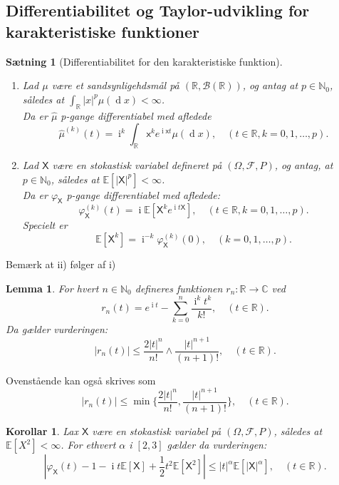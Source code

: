 \documentclass{article}
\newcommand{\N}{\mathbb{N}}
\newcommand{\R}{\mathbb{R}}
\newcommand{\C}{\mathbb{C}}
\newcommand{\E}{\mathbb{E}}
\newcommand{\1}{\mathbbm{1}}
\newcommand{\X}{\mathsf{X}}
\newcommand{\B}{\mathcal{B}}
\newcommand{\deriv}{\operatorname{d}}
\newcommand{\icomp}{\operatorname{i}}
\newcommand{\varx}{\varphi_\X}
\newcommand{\pfield}{(\Omega, \mathcal{F}, P)}
\theoremstyle{boxed}
\newtheorem{lemma}[theorem]{Lemma}
\newtheorem{corollary}[theorem]{Korollar}
\newtheorem{proposition}[theorem]{Sætning}
\begin{document}
\subsection{Differentiabilitet og Taylor-udvikling for karakteristiske funktioner}
\begin{theorem-box}
    \begin{proposition}[Differentiabilitet for den karakteristiske funktion]
        \begin{enumerate}
            \item[\textnormal{(i)}] Lad $\mu$ være et sandsynligehdsmål på $(\R, \B(\R))$, og antag at $p\in\N_0$, således at $\int_\R|x|^p\mu(\deriv x)<\infty$.
            \\Da er $\hat{\mu}$ p-gange differentiabel med afledede
            $$\hat{\mu}^{(k)}(t)=\icomp^k\int_{\R}\mathsf{x}^ke^{\icomp\mathsf{x}t}\mu(\deriv x), \quad (t\in\R, k=0,1,\dots, p).$$
            \item[\textnormal{(ii)}] Lad $\X$ være en stokastisk variabel defineret på $\pfield$, og antag, at $p\in\N_0$, således at $\E[|\X|^p]<\infty$.
            \\Da er $\varx$ p-gange differentiabel med afledede:
            $$\varx^{(k)}(t)=\icomp\E[\X^ke^{\icomp t\X}], \quad (t\in\R, k=0,1,\dots, p).$$ 
            Specielt er 
            $$\E[\X^k]=\icomp^{-k}\varx^{(k)}(0), \quad (k=0,1,\dots, p).$$
        \end{enumerate}
    \end{proposition}
\end{theorem-box}
Bemærk at ii) følger af i)
\begin{theorem-box}
    \begin{lemma}
        For hvert $n\in\N_0$ defineres funktionen $r_n:\R\rightarrow \C$ ved $$r_n(t)=e^{\icomp t}-\sum_{k=0}^n\frac{\icomp^k t^k}{k!}, \quad (t\in\R).$$
        Da gælder vurderingen:
        $$|r_n(t)|\leq \frac{2|t|^n}{n!}\wedge \frac{|t|^{n+1}}{(n+1)!},\quad  (t\in\R).$$
    \end{lemma}
\end{theorem-box}
Ovenstående kan også skrives som 
$$|r_n(t)|\leq \min\{\frac{2|t|^n}{n!},\frac{|t|^{n+1}}{(n+1)!}\},\quad  (t\in\R).$$
\begin{theorem-box}
    \begin{corollary}
        Lax $\X$ være en stokastisk variabel på $\pfield$, således at $\E[X^2]<\infty$. For ethvert $\alpha$ i $[2,3]$ gælder da vurderingen:
        $$\left|\varx(t)-1-\icomp t\E[\X]+\frac{1}{2}t^2\E[\X^2]\right|\leq |t|^\alpha\E[|\X|^\alpha], \quad (t\in\R).$$
    \end{corollary}
\end{theorem-box}
\end{document}
